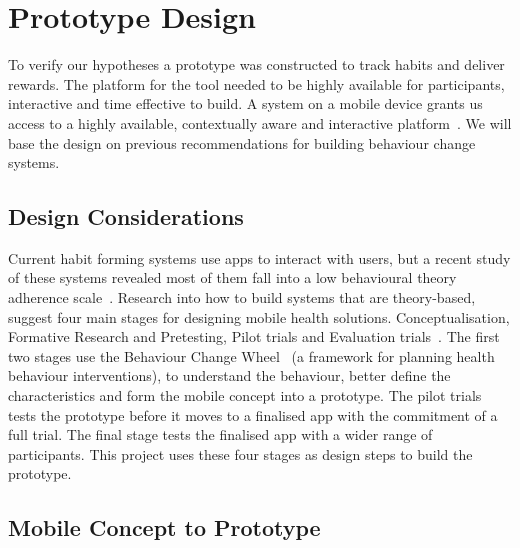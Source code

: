 
\newpage
\section{Prototype Design}

To verify our hypotheses a prototype was constructed to track habits and deliver rewards. The platform for the tool needed to be highly available for participants, interactive and time effective to build.
A system on a mobile device grants us access to a highly available, contextually aware and interactive platform~\cite{article_mhealth}. We will base the design on previous recommendations for building behaviour change systems.

\subsection{Design Considerations}

Current habit forming systems use apps to interact with users, but a recent study of these systems revealed most of them fall into a low behavioural theory adherence scale~\cite{article_mhealth}.
Research into how to build systems that are theory-based, suggest four main stages for designing mobile health solutions. Conceptualisation, Formative Research and Pretesting,
Pilot trials and Evaluation trials~\cite{article_mhealth}. The first two stages use the Behaviour Change Wheel~\cite{article_behaviour_change_wheel}
(a framework for planning health behaviour interventions), to understand the behaviour, better define the characteristics and form the mobile concept into a prototype.
The pilot trials tests the prototype before it moves to a finalised app with the commitment of a full trial. The final stage tests the finalised app with a wider range of participants.
This project uses these four stages as design steps to build the prototype.

\subsection{Mobile Concept to Prototype}

